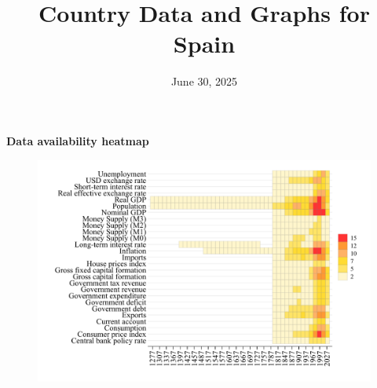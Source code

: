 \documentclass[12pt,a4paper,landscape]{article}
\begin{document}
\title{\Large Country Data and Graphs for Spain}
\date{June 30, 2025}
\maketitle
\thispagestyle{empty}

\clearpage
\setcounter{page}{1}
\hypersetup{colorlinks=true,linkcolor=blue,linktoc=all}
\label{toc}
\tableofcontents
\thispagestyle{empty}
\clearpage
{}
{}
\begin{center}
{\Large\bfseries Data availability heatmap}
\end{center}
\vspace{1cm}
\begin{figure}[H]
\centering
\includegraphics[width=\textwidth,height=0.8\textheight,keepaspectratio]{graphs/ESP_heatmap.pdf}
\end{figure}
\setcounter{page}{3}
\end{document}
